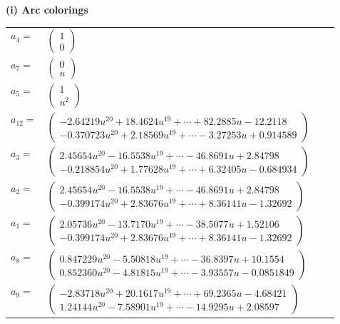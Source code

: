 \documentclass[1p]{elsarticle_modified}
\theoremstyle{definition}
\begin{document}
\flushleft \textbf{(i) Arc colorings}\\
\begin{tabular}{m{7pt} m{180pt} m{7pt} m{180pt} }
\flushright $a_{4}=$&$\begin{pmatrix}1\\0\end{pmatrix}$ \\
\flushright $a_{7}=$&$\begin{pmatrix}0\\u\end{pmatrix}$ \\
\flushright $a_{5}=$&$\begin{pmatrix}1\\u^2\end{pmatrix}$ \\
\flushright $a_{12}=$&$\begin{pmatrix}-2.64219 u^{20}+18.4624 u^{19}+\cdots+82.2885 u-12.2118\\-0.370723 u^{20}+2.18569 u^{19}+\cdots-3.27253 u+0.914589\end{pmatrix}$ \\
\flushright $a_{3}=$&$\begin{pmatrix}2.45654 u^{20}-16.5538 u^{19}+\cdots-46.8691 u+2.84798\\-0.218854 u^{20}+1.77628 u^{19}+\cdots+6.32405 u-0.684934\end{pmatrix}$ \\
\flushright $a_{2}=$&$\begin{pmatrix}2.45654 u^{20}-16.5538 u^{19}+\cdots-46.8691 u+2.84798\\-0.399174 u^{20}+2.83676 u^{19}+\cdots+8.36141 u-1.32692\end{pmatrix}$ \\
\flushright $a_{1}=$&$\begin{pmatrix}2.05736 u^{20}-13.7170 u^{19}+\cdots-38.5077 u+1.52106\\-0.399174 u^{20}+2.83676 u^{19}+\cdots+8.36141 u-1.32692\end{pmatrix}$ \\
\flushright $a_{8}=$&$\begin{pmatrix}0.847229 u^{20}-5.50818 u^{19}+\cdots-36.8397 u+10.1554\\0.852360 u^{20}-4.81815 u^{19}+\cdots-3.93557 u-0.0851849\end{pmatrix}$ \\
\flushright $a_{9}=$&$\begin{pmatrix}-2.83718 u^{20}+20.1617 u^{19}+\cdots+69.2365 u-4.68421\\1.24144 u^{20}-7.58901 u^{19}+\cdots-14.9295 u+2.08597\end{pmatrix}$ \\

\end{tabular}
\end{document}
